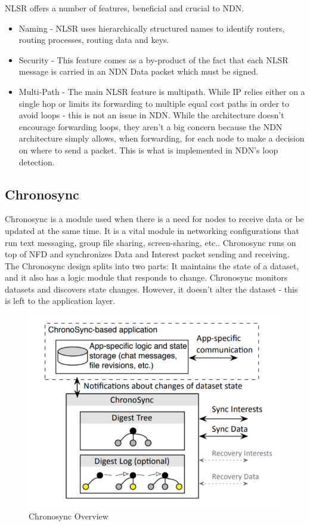 NLSR offers a number of features, beneficial and crucial to NDN.
\begin{itemize}
\item Naming - NLSR uses hierarchically structured names to identify routers, routing processes, routing data and keys\cite{034}. 
\item Security - This feature comes as a by-product of the fact that each NLSR message is carried in an NDN Data packet which must be signed. 
\item Multi-Path - The main NLSR feature is multipath. While IP relies either on a single hop or limits its forwarding to multiple equal cost paths\cite{035} in order to avoid loops - this is not an issue in NDN. While the architecture doesn't encourage forwarding loops, they aren't a big concern because the NDN architecture simply allows, when forwarding, for each node to make a decision on where to send a packet. This is what is implemented in NDN's loop detection. 
\end{itemize}
\subsection{Chronosync}
Chronosync is a module used when there is a need for nodes to receive data or be updated at the same time. It is a vital module in networking configurations that run text messaging, group file sharing, screen-sharing, etc.. Chronosync runs on top of NFD and synchronizes Data and Interest packet sending and receiving. The Chronosync design splits into two parts: It maintains the state of a dataset, and it also has a logic module that responds to change\cite{036}. Chronosync monitors datasets and discovers state changes. However, it doesn't alter the dataset - this is left to the application layer. 
\begin{figure}[ht]
\centering
\includegraphics[scale=0.5]{chronosync.png}
\caption{Chronosync Overview \cite{037}}
\end{figure}
